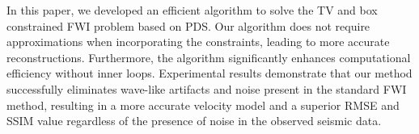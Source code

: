 In this paper, we developed an efficient algorithm to solve the TV and box constrained FWI problem based on PDS.
Our algorithm does not require approximations when incorporating the constraints, leading to more accurate reconstructions.
Furthermore, the algorithm significantly enhances computational efficiency without inner loops.
Experimental results demonstrate that our method successfully eliminates wave-like artifacts and noise present in the standard FWI method, resulting in a more accurate velocity model and a superior RMSE and SSIM value regardless of the presence of noise in the observed seismic data.
